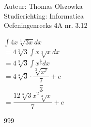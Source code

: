 \documentclass[a4paper]{article}
\newcommand{\dint}{\displaystyle\int}
\newcommand{\thirdroot}{\sqrt[3]}
\begin{document}
\noindent \large Auteur: Thomas Olszowka \\
\noindent \large Studierichting: Informatica \\
\noindent \large Oefeningenreeks 4A nr. 3.12  \\



\medskip

\normalsize

$\dint 4x \thirdroot{3x} dx$ \\

$= 4 \thirdroot{3} \dint x \thirdroot{x} dx$ \\

$=4 \thirdroot{3} \dint x^{\tfrac{4}{3}} dx$ \\

$= 4 \thirdroot{3} \cdot \dfrac{\thirdroot{x^7}}{\dfrac{7}{3}} + c$ \\

$= \dfrac{12 \thirdroot{3} x^2 \thirdroot{x}}{7} + c$ \\

\begin{thebibliography}{999}
\end{thebibliography}
\end{document}
